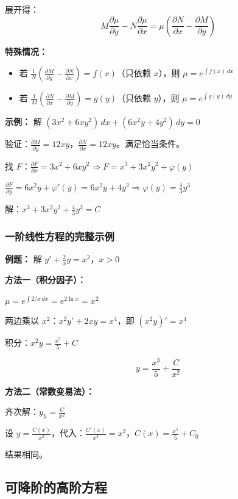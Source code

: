 展开得：
\[
M\frac{\partial \mu}{\partial y} - N\frac{\partial \mu}{\partial x} = \mu\left(\frac{\partial N}{\partial x} - \frac{\partial M}{\partial y}\right)
\]

\textbf{特殊情况：}
\begin{itemize}
  \item 若 $\frac{1}{N}\left(\frac{\partial M}{\partial y} - \frac{\partial N}{\partial x}\right) = f(x)$（只依赖 $x$），则 $\mu = e^{\int f(x)\,dx}$
  \item 若 $\frac{1}{M}\left(\frac{\partial N}{\partial x} - \frac{\partial M}{\partial y}\right) = g(y)$（只依赖 $y$），则 $\mu = e^{\int g(y)\,dy}$
\end{itemize}

\textbf{示例：} 解 $(3x^2 + 6xy^2)\,dx + (6x^2y + 4y^2)\,dy = 0$

验证：$\frac{\partial M}{\partial y} = 12xy$，$\frac{\partial N}{\partial x} = 12xy$。满足恰当条件。

找 $F$：$\frac{\partial F}{\partial x} = 3x^2 + 6xy^2 \Rightarrow F = x^3 + 3x^2y^2 + \varphi(y)$

$\frac{\partial F}{\partial y} = 6x^2y + \varphi'(y) = 6x^2y + 4y^2 \Rightarrow \varphi(y) = \frac{4}{3}y^3$

解：$x^3 + 3x^2y^2 + \frac{4}{3}y^3 = C$

\subsubsection{一阶线性方程的完整示例}

\textbf{例题：} 解 $y' + \frac{2}{x}y = x^2$，$x > 0$

\textbf{方法一（积分因子）：}

$\mu = e^{\int 2/x\,dx} = e^{2\ln x} = x^2$

两边乘以 $x^2$：$x^2 y' + 2xy = x^4$，即 $(x^2 y)' = x^4$

积分：$x^2 y = \frac{x^5}{5} + C$

\[
\boxed{y = \frac{x^3}{5} + \frac{C}{x^2}}
\]

\textbf{方法二（常数变易法）：}

齐次解：$y_h = \frac{C}{x^2}$

设 $y = \frac{C(x)}{x^2}$，代入：$\frac{C'(x)}{x^2} = x^2$，$C(x) = \frac{x^5}{5} + C_0$

结果相同。

\subsection{可降阶的高阶方程}

